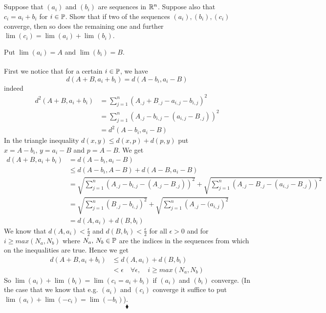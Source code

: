 \subsection{}
\begin{tcolorbox}
Suppose that $(a_i)$ and $(b_i)$ are sequences in $\mathbb{R}^n$. Suppose also that $c_i=a_i+b_i$ for $i\in\mathbb{P}$. Show that if two of the sequences
$(a_i), (b_i), (c_i)$ converge, then so does the remaining one and further $\lim (c_i) = \lim (a_i) + \lim (b_i)$.
\end{tcolorbox}
Put $ \lim (a_i)= A$ and $ \lim (b_i)= B$.\\\\
First we notice that for a certain $i\in\mathbb{P}$, we have$$d(A+B,a_i+b_i)=d(A-b_i,a_i-B)$$
indeed
\begin{align*}
d^2(A+B,a_i+b_i)&=\sum_{j=1}^n \left(A_{,j}+B_{,j}-a_{i,j}-b_{i,j}\right)^2\\
&=\sum_{j=1}^n \left(A_{,j}-b_{i,j}- (a_{i,j}-B_{,j})\right)^2\\
&=d^2(A-b_i, a_i-B)
\end{align*} 
In the triangle inequality $d(x,y)\leq d(x,p)+d(p,y)$ put $x=A-b_i,\, y=  a_i-B$ and $p=A-B$. We get
\begin{align*}
d(A+B,a_i+b_i)&=d(A-b_i, a_i-B)\\
&\leq d(A-b_i,A-B)+d(A-B,a_i-B)\\
&= \sqrt{\sum_{j=1}^n \left(A_{,j}-b_{i,j}- (A_{,j}-B_{,j})\right)^2}+\sqrt{\sum_{j=1}^n \left(A_{,j}-B_{,j}-(a_{i,j}- B_{,j})\right)^2}\\
&= \sqrt{\sum_{j=1}^n \left(B_{,j}-b_{i,j}\right)^2}+\sqrt{\sum_{j=1}^n \left(A_{,j}-(a_{i,j}\right)^2}\\
&= d(A,a_i)+d(B,b_i)
\end{align*}
We know that $d(A,a_i)<\frac{\epsilon}{2}$ and $d(B,b_i)<\frac{\epsilon}{2}$ for all $\epsilon >0$ and for $i\geq max(N_a,N_b)$ where $N_a,\, N_b\in \mathbb{P}$ are the indices in the sequences from which on the inequalities are true. Hence we get 
\begin{align*}
d(A+B,a_i+b_i)&\leq d(A,a_i)+d(B,b_i)\\
&<\epsilon\quad \forall\epsilon,\quad i\geq max(N_a,N_b)
\end{align*}
So $ \lim (a_i) + \lim (b_i)=\lim (c_i=a_i+b_i) $ if $(a_i)$ and $(b_i)$ converge. (In the case that we know that e.g. $(a_i)$ and $(c_i)$ converge it suffice to put $ \lim (a_i) + \lim (-c_i)=\lim (-b_i) $).
$$\blacklozenge$$\\


